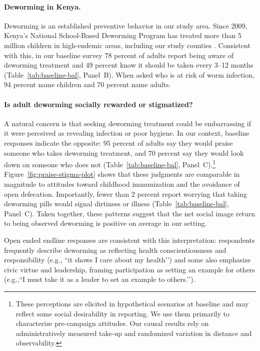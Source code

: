 \documentclass[12pt,a4paper]{article}
\begin{document}
\paragraph{Deworming in Kenya.}
Deworming is an established preventive behavior in our study area. Since 2009, Kenya’s National School-Based Deworming Program has treated more than 5 million children in high-endemic areas, including our study counties \citep{givewell2017}. Consistent with this, in our baseline survey 78 percent of adults report being aware of deworming treatment and 49 percent know it should be taken every 3--12 months (Table~\ref{tab:baseline-bal}, Panel~B). When asked who is at risk of worm infection, 94 percent name children and 70 percent name adults.

\paragraph{Is adult deworming socially rewarded or stigmatized?}
A natural concern is that seeking deworming treatment could be embarrassing if it were perceived as revealing infection or poor hygiene. In our context, baseline responses indicate the opposite: 95 percent of adults say they would praise someone who takes deworming treatment, and 70 percent say they would look down on someone who does not (Table~\ref{tab:baseline-bal}, Panel~C).\footnote{These perceptions are elicited in hypothetical scenarios at baseline and may reflect some social desirability in reporting. We use them primarily to characterize pre-campaign attitudes. Our causal results rely on administratively measured take-up and randomized variation in distance and observability.} Figure~\ref{fig:praise-stigma-plot} shows that these judgments are comparable in magnitude to attitudes toward childhood immunization and the avoidance of open defecation. Importantly, fewer than 2 percent report worrying that taking deworming pills would signal dirtiness or illness (Table~\ref{tab:baseline-bal}, Panel~C). Taken together, these patterns suggest that the net social image return to being observed deworming is positive on average in our setting.

Open ended endline responses are consistent with this interpretation: respondents frequently describe deworming as reflecting health conscientiousness and responsibility (e.g., ``it shows I care about my health’’) and some also emphasize civic virtue and leadership, framing participation as setting an example for others (e.g.,``I must take it as a leader to set an example to others.’’).   
\end{document}
